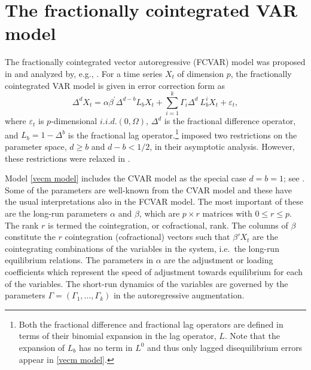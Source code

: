 \documentclass[article]{jss}
\begin{document}
\section{The fractionally cointegrated VAR model} \label{sec:fcvar}


The fractionally cointegrated vector autoregressive (FCVAR) model was proposed in \cite{Johansen2008} and analyzed by, e.g., \cite{johniel2010,johansen2012likelihood}. For a time series $X_{t}$ of dimension $p$, the fractionally cointegrated VAR model is given in error correction form as
\begin{equation}
\Delta^{d}X_{t}= \alpha \beta^{\prime} \Delta^{d-b} L_{b} X_{t} + 
\sum_{i=1}^{k}\Gamma_{i}\Delta^{d}\ L_{b}^{i}X_{t}
+ \varepsilon_{t},
\label{vecm model}%
\end{equation}
where $\varepsilon_{t}$ is $p$-dimensional $i.i.d.(0,\Omega)$, $\Delta^{d}$ is the fractional difference operator, and $L_{b}=1-\Delta^{b}$ is the fractional lag operator.\footnote{Both the fractional difference and fractional lag operators are defined in terms of their binomial expansion in the lag operator, $L$. Note that the expansion of $L_{b}$ has no term in $L^{0}$ and thus only lagged disequilibrium errors appear in \eqref{vecm model}.} \cite{johansen2012likelihood} imposed two restrictions on the parameter space, $d\geq b$ and $d-b<1/2$, in their asymptotic analysis. However, these restrictions were relaxed in \cite{JN2018b,JN2018}.

Model \eqref{vecm model} includes the \cite{Johansen1995} CVAR model as the special case $d=b=1$; see \cite{JN2018}. Some of the parameters are well-known from the CVAR model and these have the usual interpretations also in the FCVAR model. The most important of these are the long-run parameters $\alpha$ and $\beta$, which are $p \times r$ matrices with $0 \leq r \leq p$. The rank $r$ is termed the cointegration, or cofractional, rank. The columns of $\beta$ constitute the $r$ cointegration (cofractional) vectors such that $\beta' X_t$ are the cointegrating combinations of the variables in the system, i.e.\ the long-run equilibrium relations. The parameters in $\alpha$ are the adjustment or loading coefficients which represent the speed of adjustment towards equilibrium for each of the variables. The short-run dynamics of the variables are governed by the parameters $\Gamma=(\Gamma _{1},\ldots ,\Gamma _{k})$ in the autoregressive augmentation.
\end{document}
